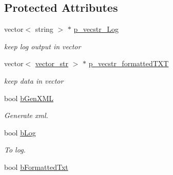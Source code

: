 \subsection*{Protected Attributes}
\begin{DoxyCompactItemize}
\item 
\hypertarget{classstats__keeper_a63b7a9f360e0a77d64236c59427c5a70}{
vector$<$ string $>$ $\ast$ \hyperlink{classstats__keeper_a63b7a9f360e0a77d64236c59427c5a70}{p\_\-vecstr\_\-Log}}
\label{classstats__keeper_a63b7a9f360e0a77d64236c59427c5a70}

\begin{DoxyCompactList}\small\item\em keep log output in vector \item\end{DoxyCompactList}\item 
\hypertarget{classstats__keeper_ace46f580da108c5ddbef12d0733f4569}{
vector$<$ \hyperlink{structvector__str}{vector\_\-str} $>$ $\ast$ \hyperlink{classstats__keeper_ace46f580da108c5ddbef12d0733f4569}{p\_\-vecstr\_\-formattedTXT}}
\label{classstats__keeper_ace46f580da108c5ddbef12d0733f4569}

\begin{DoxyCompactList}\small\item\em keep data in vector \item\end{DoxyCompactList}\item 
\hypertarget{classstats__keeper_a575bbfaa39e0f4d816d9229bc5d19795}{
bool \hyperlink{classstats__keeper_a575bbfaa39e0f4d816d9229bc5d19795}{bGenXML}}
\label{classstats__keeper_a575bbfaa39e0f4d816d9229bc5d19795}

\begin{DoxyCompactList}\small\item\em Generate xml. \item\end{DoxyCompactList}\item 
\hypertarget{classstats__keeper_a9d490ff7931f71f3cc8f925b8a7cdd8b}{
bool \hyperlink{classstats__keeper_a9d490ff7931f71f3cc8f925b8a7cdd8b}{bLog}}
\label{classstats__keeper_a9d490ff7931f71f3cc8f925b8a7cdd8b}

\begin{DoxyCompactList}\small\item\em To log. \item\end{DoxyCompactList}\item 
\hypertarget{classstats__keeper_a1e4fed8a069f534f85c5bc0b4054bbe6}{
bool \hyperlink{classstats__keeper_a1e4fed8a069f534f85c5bc0b4054bbe6}{bFormattedTxt}}
\label{classstats__keeper_a1e4fed8a069f534f85c5bc0b4054bbe6}


\end{DoxyCompactItemize}
